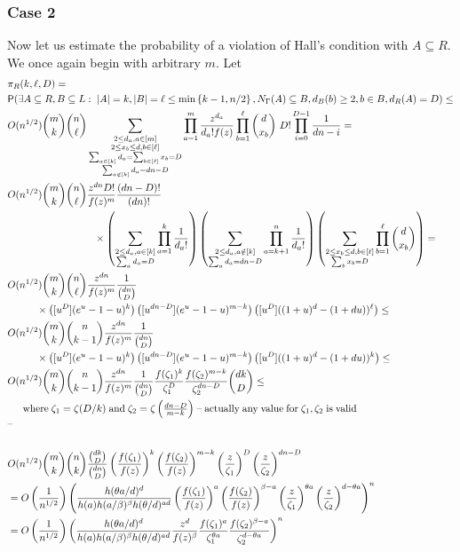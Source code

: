 \documentclass[11pt]{article}
\def\b{\beta}
\def\G{\Gamma}
\def\z{\zeta}
\def\th{\theta}
\def\p{\pi}
\newcommand{\set}[1]{\left\{#1\right\}}
\def\Pr{{\sf P}}
\newcommand{\brac}[1]{\left(#1\right)}
\newcommand{\bfrac}[2]{\brac{\frac{#1}{#2}}}
\begin{document}
\subsubsection{Case 2}\label{AinR}
Now let us estimate the probability of a violation of Hall's condition with $A\subseteq R$. We once again begin with arbitrary $m$.
Let
\begin{align}
&\p_R(k,\ell,D)=\nonumber\\
&\Pr(\exists A\subseteq R,B\subseteq L:\;|A|=k,|B|=\ell\leq \min\set{k-1,n/2},N_\G(A)
\subseteq B,d_B(b)\geq 2,b\in B,d_R(A)=D)\leq \nonumber\\
&O(n^{1/2})\binom{m}{k}\binom{n}{\ell}\sum_{\substack{2\leq  d_a,a\in[m]\\2\leq x_b\leq d,b\in[\ell]\\
\sum_{a\in [k]}d_a=\sum_{b\in [\ell]}x_b=D\\\sum_{a\notin [k]}d_a=dn-D}}\prod_{a=1}^m\frac{z^{d_a}}{d_a!f(z)}
\prod_{b=1}^{\ell}\binom{d}{x_b}\ D!\prod_{i=0}^{D-1}\frac{1}{dn-i}=\label{expl1}\\
&O(n^{1/2})\binom{m}{k}\binom{n}{\ell}\frac{z^{dn}D!}{f(z)^m}\frac{(dn-D)!}{(dn)!}\nonumber\\
&\hskip3cm\times\brac{\sum_{\substack{2\leq  d_a,a\in[k]\\\sum_ad_a=D}}\prod_{a=1}^k\frac{1}{d_a!}}
\brac{\sum_{\substack{2\leq  d_a,a\notin[k]\\\sum_ad_a=dn-D}}\prod_{a=k+1}^n\frac{1}{d_a!}}
\brac{\sum_{\substack{2\leq x_b\leq d,b\in[\ell]\\\sum_bx_b=D}}\prod_{b=1}^{\ell}\binom{d}{x_b}}=\nonumber\\
&O(n^{1/2})\binom{m}{k}\binom{n}{\ell}\frac{z^{dn}}{f(z)^m}\frac{1}{\binom{dn}{D}}\nonumber\\
&\hskip1cm\times\brac{[u^D](e^u-1-u)^k}\brac{[u^{dn-D}](e^u-1-u)^{m-k}}\brac{[u^D]((1+u)^d-(1+du))^\ell}\leq\nonumber\\
&O(n^{1/2})\binom{m}{k}\binom{n}{k-1}\frac{z^{dn}}{f(z)^m}\frac{1}{\binom{dn}{D}}\nonumber\\
&\hskip1cm\times\brac{[u^D](e^u-1-u)^k}\brac{[u^{dn-D}](e^u-1-u)^{m-k}}\brac{[u^D]((1+u)^d-(1+du))^k}\leq\label{colbert}\\
&O(n^{1/2})\binom{m}{k}\binom{n}{k-1}\frac{z^{dn}}{f(z)^m}\frac{1}{\binom{dn}{D}}\frac{f(\z_1)^k}{\z_1^D}
\frac{f(\z_2)^{m-k}}{\z_2^{dn-D}}\binom{dk}{D}\leq\nonumber\\
\noalign{where $\z_1=\z(D/k)$ and
$\z_2=\z\bfrac{dn-D}{m-k}$ -- actually any value for $\z_1,\z_2$ is valid --}\nonumber\\
&O(n^{1/2})\binom{m}{k}\binom{n}{k}\frac{\binom{dk}{D}}{\binom{dn}{D}}
\bfrac{f(\z_1)}{f(z)}^k\bfrac{f(\z_2)}{f(z)}^{m-k}\bfrac{z}{\z_1}^D\bfrac{z}{\z_2}^{dn-D}\label{3xx}\\
&=O\bfrac{1}{n^{1/2}}\brac{\frac{h(\th a/d)^d}{h(a)h(a/\b)^\b h(\th/d)^{ad}}\bfrac{f(\z_1)}{f(z)}^a\bfrac{f(\z_2)}{f(z)}^{\b-a}
\bfrac{z}{\z_1}^{\th a}\bfrac{z}{\z_2}^{d-\th a}}^n\label{3axx}\\
&=O\bfrac{1}{n^{1/2}}\brac{\frac{h(\th a/d)^d}{h(a)h(a/\b)^\b h(\th/d)^{ad}}
\frac{z^d}{f(z)^\b}\frac{f(\z_1)^a}{\z_1^{\th a}}\frac{f(\z_2)^{\b-a}}{\z_2^{d-\th a}}}^n\label{3ayxw}
\end{align}
\end{document}

